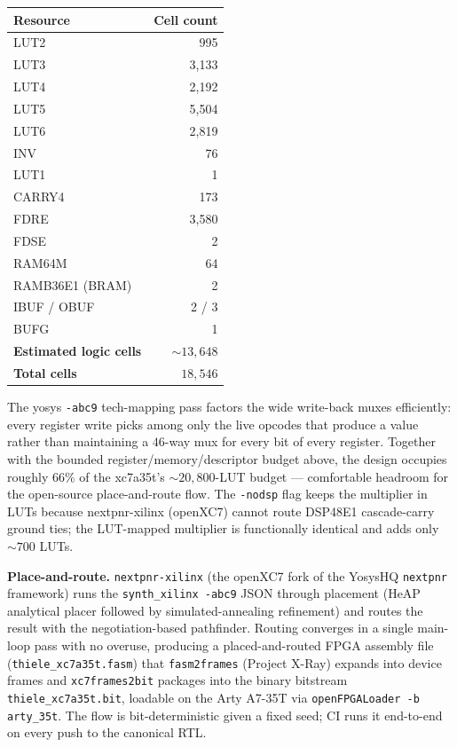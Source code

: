 \begin{center}
\begin{tabular}{|l|r|}
\hline
\textbf{Resource} & \textbf{Cell count} \\
\hline
LUT2              &     995 \\
LUT3              & 3{,}133 \\
LUT4              & 2{,}192 \\
LUT5              & 5{,}504 \\
LUT6              & 2{,}819 \\
INV               &      76 \\
LUT1              &       1 \\
CARRY4            &     173 \\
FDRE              & 3{,}580 \\
FDSE              &       2 \\
RAM64M            &      64 \\
RAMB36E1 (BRAM)   &       2 \\
IBUF / OBUF       &       2 / 3 \\
BUFG              &       1 \\
\hline
\textbf{Estimated logic cells} & $\sim 13{,}648$ \\
\textbf{Total cells}           & $18{,}546$ \\
\hline
\end{tabular}
\end{center}

\noindent
The yosys \texttt{-abc9} tech-mapping pass factors the wide write-back
muxes efficiently: every register write picks among only the live opcodes
that produce a value rather than maintaining a $46$-way mux for every bit
of every register. Together with the bounded register/memory/descriptor
budget above, the design occupies roughly $66\%$ of the xc7a35t's
$\sim 20{,}800$-LUT budget --- comfortable headroom for the open-source
place-and-route flow. The \texttt{-nodsp} flag keeps the multiplier in
LUTs because nextpnr-xilinx (openXC7) cannot route DSP48E1 cascade-carry
ground ties; the LUT-mapped multiplier is functionally identical and
adds only $\sim 700$ LUTs.

\noindent\textbf{Place-and-route.} \texttt{nextpnr-xilinx} (the openXC7
fork of the YosysHQ \texttt{nextpnr} framework) runs the
\texttt{synth\_xilinx -abc9} JSON through placement (HeAP analytical placer
followed by simulated-annealing refinement) and routes the result with
the negotiation-based pathfinder. Routing converges in a single main-loop
pass with no overuse, producing a placed-and-routed FPGA assembly file
(\texttt{thiele\_xc7a35t.fasm}) that \texttt{fasm2frames} (Project X-Ray)
expands into device frames and \texttt{xc7frames2bit} packages into the
binary bitstream \texttt{thiele\_xc7a35t.bit}, loadable on the Arty A7-35T
via \texttt{openFPGALoader -b arty\_35t}. The flow is bit-deterministic
given a fixed seed; CI runs it end-to-end on every push to the canonical
RTL.


